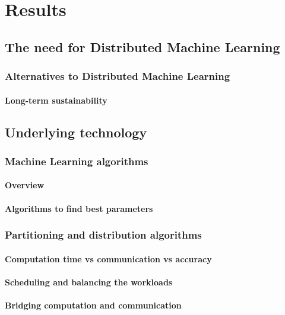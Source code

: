 \section{Results}

\subsection{The need for Distributed Machine Learning}
\subsubsection{Alternatives to Distributed Machine Learning}
\paragraph{Long-term sustainability}










\subsection{Underlying technology}
\subsubsection{Machine Learning algorithms}
\paragraph{Overview}
\paragraph{Algorithms to find best parameters}
\subsubsection{Partitioning and distribution algorithms}
\paragraph{Computation time vs communication vs accuracy}
\paragraph{Scheduling and balancing the workloads}
\paragraph{Bridging computation and communication}
